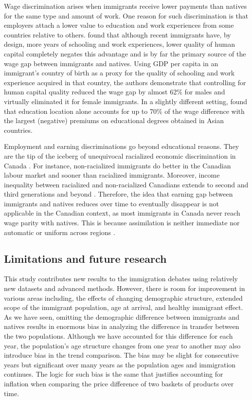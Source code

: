 \vspace{0.7em}\par
Wage discrimination arises when immigrants receive lower payments than natives for the same type and amount of work.
One reason for such discrimination is that employers attach a lower value to education and work experiences from some countries relative to others.
\citet{Coulombe:2014ir} found that although recent immigrants have, by design, more years of schooling and work experiences, lower quality of human capital completely negates this advantage and is by far the primary source of the wage gap between immigrants and natives.
Using GDP per capita in an immigrant's country of birth as a proxy for the quality of schooling and work experience acquired in that country, the authors demonstrate that controlling for human capital quality reduced the wage gap by almost 62\% for males and virtually eliminated it for female immigrants.
In a slightly different setting, \citet{Fortin:2016hl} found that education location alone accounts for up to 70\% of the wage difference with the largest (negative) premiums on educational degrees obtained in Asian countries.

\vspace{0.7em}\par
Employment and earning discriminations go beyond educational reasons.
They are the tip of the iceberg of unequivocal racialized economic discrimination in Canada \citep{Block:2019va}.
For instance, non-racialized immigrants do better in the Canadian labour market and sooner than racialized immigrants.
Moreover, income inequality between racialized and non-racialized Canadians extends to second and third generations and beyond \citep{Block:2019va}.
Therefore, the idea that earning gap between immigrants and natives reduces over time to eventually disappear is not applicable in the Canadian context, as most immigrants in Canada never reach wage parity with natives.
This is because assimilation is neither immediate nor automatic \citep{Hum:2000gz} or uniform across regions \citep{Nadeau:2010jd}.


\subsection{Limitations and future research}

This study contributes new results to the immigration debates using relatively new datasets and advanced methods.
However, there is room for improvement in various areas including, the effects of changing demographic structure, extended scope of the immigrant population, age at arrival, and healthy immigrant effect.
As we have seen, omitting the demographic difference between immigrants and natives results in enormous bias in analyzing the difference in transfer between the two populations.
Although we have accounted for this difference for each year, the population's age structure changes from one year to another may also introduce bias in the trend comparison.
The bias may be slight for consecutive years but significant over many years as the population ages and immigration continues.
The logic for such bias is the same that justifies accounting for inflation when comparing the price difference of two baskets of products over time.


